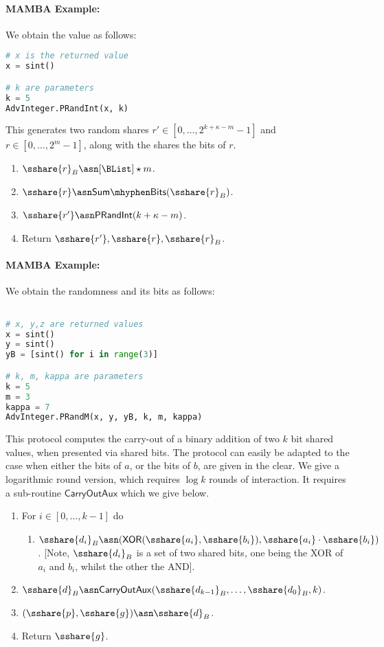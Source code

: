 \paragraph{MAMBA Example:}  We obtain the value as follows: 
\begin{lstlisting}[language={python}]
# x is the returned value
x = sint()

# k are parameters
k = 5
AdvInteger.PRandInt(x, k)
\end{lstlisting}

This generates two random shares $r' \in [0,\ldots,2^{k+\kappa-m}-1]$
and $r \in [0,\ldots,2^m-1]$, along with the shares the bits of $r$.
\begin{enumerate}
\item $\sshare{r}_B \asn [\BList]\star m$.
\item $\sshare{r} \asn \mathsf{Sum\mhyphen Bits}(\sshare{r}_B)$.
\item $\sshare{r'} \asn \mathsf{PRandInt}(k+\kappa-m)$.
\item Return $\sshare{r'}, \sshare{r}, \sshare{r}_B$.
\end{enumerate}
\paragraph{MAMBA Example:}  We obtain the randomness and its bits as follows: 
\begin{lstlisting}[language={python}]

# x, y,z are returned values
x = sint()
y = sint()
yB = [sint() for i in range(3)]

# k, m, kappa are parameters
k = 5
m = 3
kappa = 7
AdvInteger.PRandM(x, y, yB, k, m, kappa)
\end{lstlisting}

This protocol computes the carry-out of a binary addition of
two $k$ bit shared values, when presented via shared bits.
The protocol can easily be adapted to the case when either
the bits of $a$, or the bits of $b$, are given in the clear.
We give a logarithmic round version, which requires $\log k$
rounds of interaction.
It requires a sub-routine $\mathsf{CarryOutAux}$ which we
give below.
\begin{enumerate}
\item For $i \in [0,\ldots,k-1]$ do
\begin{enumerate}
\item $\sshare{d_i}_B \asn (\mathsf{XOR}(\sshare{a_i},\sshare{b_i}),
	                    \sshare{a_i}\cdot \sshare{b_i})$.
      [Note, $\sshare{d_i}_B$ is a set of two shared bits, one being the XOR
      of $a_i$ and $b_i$, whilst the other the AND].
\end{enumerate}
\item $\sshare{d}_B \asn \mathsf{CarryOutAux}(\sshare{d_{k-1}}_B,\ldots,\sshare{d_0}_B,k)$.
\item $(\sshare{p},\sshare{g}) \asn \sshare{d}_B$.
\item Return $\sshare{g}$.
\end{enumerate}
